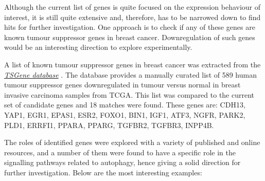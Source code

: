 \newline

Although the current list of genes is quite focused on the expression behaviour of interest, it is still quite extensive and, therefore, has to be narrowed down to find hits for further investigation.  One approach is to check if any of these genes are known tumour suppressor genes in breast cancer. Downregulation of such genes would be an interesting direction to  explore experimentally. 

A list of known tumour suppressor genes in breast cancer was extracted from the \hyperlink{https://bioinfo.uth.edu/TSGene/}{\textit{TSGene database}} \cite{Zhao2016TSGeneGenes}. The database provides a manually curated list of 589 human tumour suppressor genes downregulated in tumour versus normal in breast invasive carcinoma samples from TCGA. This list was compared to the current set of candidate genes and 18 matches were found. These genes are: CDH13, YAP1, EGR1, EPAS1, ESR2, FOXO1, BIN1, IGF1, ATF3, NGFR, PARK2, PLD1, ERRFI1, PPARA, PPARG, TGFBR2, TGFBR3, INPP4B. 

The roles of identified genes were explored with a variety of published and online resources, and a number of them were found to have a specific role in the signalling pathways related to autophagy, hence giving a solid direction for further investigation. Below are the most interesting examples:

